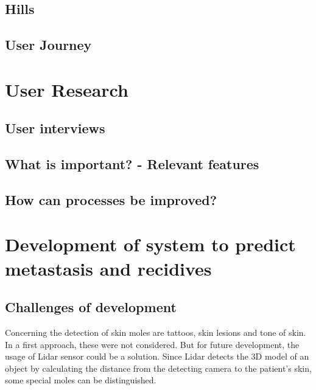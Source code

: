 \subsection{Hills}


\subsection{User Journey}


\section{User Research}
\subsection{User interviews}
\subsection{What is important? - Relevant features}
\subsection{How can processes be improved?}


\section{Development of system to predict metastasis and recidives} 

\subsection{Challenges of development}
Concerning the detection of skin moles are tattoos, skin lesions and tone of skin. In a first approach, these were not considered. But for future development, the usage of Lidar sensor could be a solution. Since Lidar detects the 3D model of an object by calculating the distance from the detecting camera to the patient's skin, some special moles can be distinguished. 


